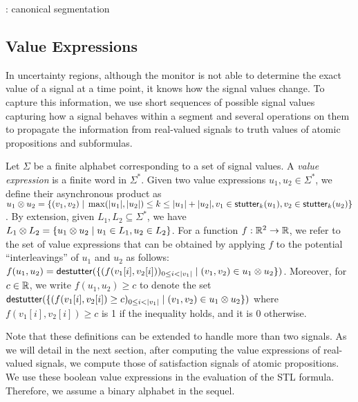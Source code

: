 \begin{example}
	\TODO: canonical segmentation
\end{example}

\subsection{Value Expressions}
In uncertainty regions, although the monitor is not able to determine the exact value of a signal at a time point, it knows how the signal values change.
To capture this information, we use short sequences of possible signal values capturing how a signal behaves within a segment and several operations on them to propagate the information from real-valued signals to truth values of atomic propositions and subformulas.


Let $\Sigma$ be a finite alphabet corresponding to a set of signal values.
A \emph{value expression} is a finite word in $\Sigma^*$.
Given two value expressions $u_1, u_2 \in \Sigma^*$, we define their asynchronous product as $u_1 \otimes u_2 = \{ (v_1,v_2) \st \max(|u_1|, |u_2|) \leq k \leq |u_1| + |u_2|, v_1 \in \stutter_k(u_1), v_2 \in \stutter_k(u_2) \}$.
By extension, given $L_1, L_2 \subseteq \Sigma^*$, we have $L_1 \otimes L_2 = \{ u_1 \otimes u_2 \st u_1 \in L_1, u_2 \in L_2 \}$.
For a function $f : \mathbb{R}^2 \to \mathbb{R}$, we refer to the set of value expressions that can be obtained by applying $f$ to the potential ``interleavings'' of $u_1$ and $u_2$ as follows: $f(u_1, u_2) = \destutter(\{(f(v_1[i], v_2[i]))_{0 \leq i < |v_1|} \st (v_1, v_2) \in u_1 \otimes u_2\})$.
Moreover, for $c \in \mathbb{R}$, we write $f(u_1, u_2) \geq c$ to denote the set $\destutter(\{(f(v_1[i], v_2[i]) \geq c)_{0 \leq i < |v_1|} \st (v_1, v_2) \in u_1 \otimes u_2\})$ where $f(v_1[i], v_2[i]) \geq c$ is 1 if the inequality holds, and it is 0 otherwise.

Note that these definitions can be extended to handle more than two signals.
As we will detail in the next section, after computing the value expressions of real-valued signals, we compute those of satisfaction signals of atomic propositions.
We use these boolean value expressions in the evaluation of the STL formula.
Therefore, we assume a binary alphabet in the sequel.

